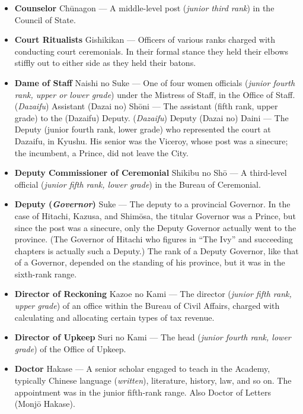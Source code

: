 \documentclass{article}
\begin{document}
\begin{multicols}{2}
\begin{small}
\begin{itemize}[
				label=,
				leftmargin=0em,
				rightmargin=-1.5em,
				itemindent=-2em,
			]
			\item \textbf{Counselor} Chūnagon --- A middle-level post (\textit{junior third rank}) in the Council of State.

			\item \textbf{Court Ritualists} Gishikikan --- Officers of various ranks charged with conducting court ceremonials. In their formal stance they held their elbows stiffly out to either side as they held their batons.

			\item \textbf{Dame of Staff} Naishi no Suke --- One of four women officials (\textit{junior fourth rank, upper or lower grade}) under the Mistress of Staff, in the Office of Staff.
			      (\textit{Dazaifu}) Assistant (Dazai no) Shōni --- The assistant (fifth rank, upper grade) to the (Dazaifu) Deputy.
			      (\textit{Dazaifu}) Deputy (Dazai no) Daini --- The Deputy (junior fourth rank, lower grade) who represented the court at Dazaifu, in Kyushu. His senior was the Viceroy, whose post was a sinecure; the incumbent, a Prince, did not leave the City.

			\item \textbf{Deputy Commissioner of Ceremonial} Shikibu no Shō --- A third-level official (\textit{junior fifth rank, lower grade}) in the Bureau of Ceremonial.

			\item \textbf{Deputy (\textit{Governor})} Suke --- The deputy to a provincial Governor. In the case of Hitachi, Kazusa, and Shimōsa, the titular Governor was a Prince, but since the post was a sinecure, only the Deputy Governor actually went to the province. (The Governor of Hitachi who figures in “The Ivy” and succeeding chapters is actually such a Deputy.) The rank of a Deputy Governor, like that of a Governor, depended on the standing of his province, but it was in the sixth-rank range.

			\item \textbf{Director of Reckoning} Kazoe no Kami --- The director (\textit{junior fifth rank, upper grade}) of an office within the Bureau of Civil Affairs, charged with calculating and allocating certain types of tax revenue.

			\item \textbf{Director of Upkeep} Suri no Kami --- The head (\textit{junior fourth rank, lower grade}) of the Office of Upkeep.

			\item \textbf{Doctor} Hakase --- A senior scholar engaged to teach in the Academy, typically Chinese language (\textit{written}), literature, history, law, and so on. The appointment was in the junior fifth-rank range. Also Doctor of Letters (Monjō Hakase).


\end{itemize}
\end{small}
\end{multicols}
\end{document}
